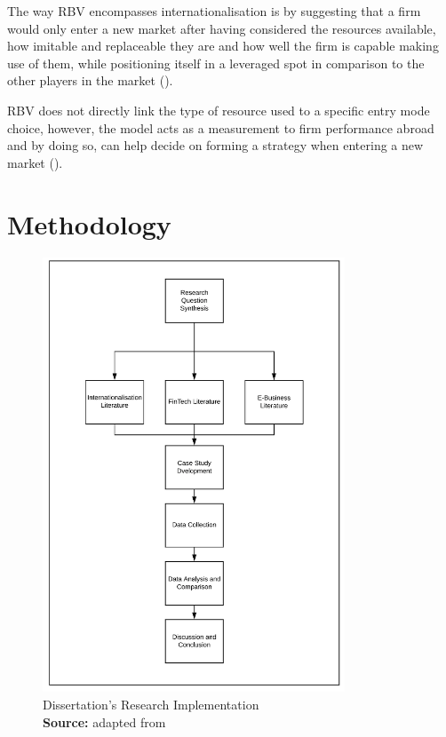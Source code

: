 \documentclass[11pt,a4paper]{article}
\newcommand*{\captionsource}[2]{%
  \caption[{#1}]{%
    #1%
    \\\hspace{\linewidth}%
    \textbf{Source:} #2%
  }%
}
\begin{document}
{{The way RBV encompasses internationalisation is by suggesting that a firm would only enter a new market after having considered the resources available, how imitable and replaceable they are and how well the firm is capable making use of them, while positioning itself in a leveraged spot in comparison to the other players in the market (\cite{ruzzierResourcebasedApproachInternationalisation2006}).  \par
RBV does not directly link the type of resource used to a specific entry mode choice, however, the model acts as a measurement to firm performance abroad and by doing so, can help decide on forming a strategy when entering a new market (\cite{tulungResourceAvailabilityFirm2017}). 
\newpage

\section{Methodology}
\vspace{-2mm}

\begin{figure}[H]
	\centering
  \includegraphics[width=90mm]{figures/fig_research_plan}
  \vspace{5mm}
    \captionsetup{justification=centering,margin=2cm}
      \captionsource{Dissertation's Research Implementation}{adapted from \cite{sinkovicsEmployingInformationCommunication2006}}
	\label{fig:research_plan}
\end{figure}


}}
\end{document}
